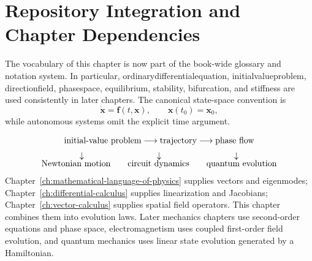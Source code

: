 \section{Repository Integration and Chapter Dependencies}
\label{sec:ch4-integration}

The vocabulary of this chapter is now part of the book-wide glossary and notation system. In particular, \gls{ordinarydifferentialequation}, \gls{initialvalueproblem}, \gls{directionfield}, \gls{phasespace}, \gls{equilibrium}, \gls{stability}, \gls{bifurcation}, and \gls{stiffness} are used consistently in later chapters. The canonical state-space convention is
\[
\dot{\mathbf x}=\mathbf f(t,\mathbf x),
\qquad
\mathbf x(t_0)=\mathbf x_0,
\]
while autonomous systems omit the explicit time argument.

\begin{physicalbox}
\[
\begin{array}{c}
\text{initial-value problem}\longrightarrow\text{trajectory}\longrightarrow\text{phase flow}\\[2mm]
\downarrow\hspace{30mm}\downarrow\hspace{30mm}\downarrow\\[-1mm]
\text{Newtonian motion}\qquad\text{circuit dynamics}\qquad\text{quantum evolution}
\end{array}
\]
Chapter~\ref{ch:mathematical-language-of-physics} supplies vectors and eigenmodes; Chapter~\ref{ch:differential-calculus} supplies linearization and Jacobians; Chapter~\ref{ch:vector-calculus} supplies spatial field operators. This chapter combines them into evolution laws. Later mechanics chapters use second-order equations and phase space, electromagnetism uses coupled first-order field evolution, and quantum mechanics uses linear state evolution generated by a Hamiltonian.
\end{physicalbox}

